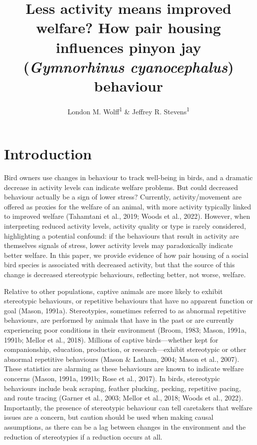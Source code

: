 \documentclass[
  pub]{apa6}
\title{Less activity means improved welfare? How pair housing influences pinyon jay (\emph{Gymnorhinus cyanocephalus}) behaviour}
\author{London M. Wolff\textsuperscript{1} \& Jeffrey R. Stevens\textsuperscript{1}}
\date{}
\affiliation{\vspace{0.5cm}\textsuperscript{1} Department of Psychology, Center for Brain, Biology \& Behavior, University of Nebraska, Lincoln, Lincoln, NE, USA}
\begin{document}
\maketitle

\section{Introduction}\label{introduction}

Bird owners use changes in behaviour to track well-being in birds, and a dramatic decrease in activity levels can indicate welfare problems. But could decreased behaviour actually be a sign of lower stress? Currently, activity/movement are offered as proxies for the welfare of an animal, with more activity typically linked to improved welfare (Tahamtani et al., 2019; Woods et al., 2022). However, when interpreting reduced activity levels, activity quality or type is rarely considered, highlighting a potential confound: if the behaviours that result in activity are themselves signals of stress, lower activity levels may paradoxically indicate better welfare. In this paper, we provide evidence of how pair housing of a social bird species is associated with decreased activity, but that the source of this change is decreased stereotypic behaviours, reflecting better, not worse, welfare.

Relative to other populations, captive animals are more likely to exhibit stereotypic behaviours, or repetitive behaviours that have no apparent function or goal (Mason, 1991a). Stereotypies, sometimes referred to as abnormal repetitive behaviours, are performed by animals that have in the past or are currently experiencing poor conditions in their environment (Broom, 1983; Mason, 1991a, 1991b; Mellor et al., 2018). Millions of captive birds---whether kept for companionship, education, production, or research---exhibit stereotypic or other abnormal repetitive behaviours (Mason \& Latham, 2004; Mason et al., 2007). These statistics are alarming as these behaviours are known to indicate welfare concerns (Mason, 1991a, 1991b; Rose et al., 2017). In birds, stereotypic behaviours include beak scraping, feather plucking, pecking, repetitive pacing, and route tracing (Garner et al., 2003; Mellor et al., 2018; Woods et al., 2022). Importantly, the presence of stereotypic behaviour can tell caretakers that welfare issues are a concern, but caution should be used when making causal assumptions, as there can be a lag between changes in the environment and the reduction of stereotypies if a reduction occurs at all.
\end{document}
